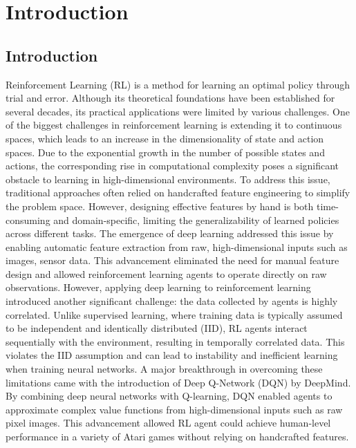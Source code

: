 

\chapter{Introduction}\label{chapter1}
\section{Introduction} \label{chap1:sec1}

Reinforcement Learning (RL) \cite{RL} is a method for learning an optimal policy through trial and error.
Although its theoretical foundations have been established for several decades, its practical applications were limited by various challenges.
One of the biggest challenges in reinforcement learning is extending it to continuous spaces, which leads to an increase in the dimensionality of state and action spaces.
Due to the exponential growth in the number of possible states and actions, the corresponding rise in computational complexity poses a significant obstacle to learning in high-dimensional environments.
To address this issue, traditional approaches often relied on handcrafted feature engineering to simplify the problem space.
However, designing effective features by hand is both time-consuming and domain-specific, limiting the generalizability of learned policies across different tasks.
The emergence of deep learning addressed this issue by enabling automatic feature extraction from raw, high-dimensional inputs such as images, sensor data.
This advancement eliminated the need for manual feature design and allowed reinforcement learning agents to operate directly on raw observations.
However, applying deep learning to reinforcement learning introduced another significant challenge: the data collected by agents is highly correlated.
Unlike supervised learning, where training data is typically assumed to be independent and identically distributed (IID), RL agents interact sequentially with the environment, resulting in temporally correlated data.
This violates the IID assumption and can lead to instability and inefficient learning when training neural networks.
A major breakthrough in overcoming these limitations came with the introduction of Deep Q-Network (DQN) \cite{DQN1, DQN2} by DeepMind.
By combining deep neural networks with Q-learning, DQN enabled agents to approximate complex value functions from high-dimensional inputs such as raw pixel images.
This advancement allowed RL agent could achieve human-level performance in a variety of Atari games without relying on handcrafted features.
